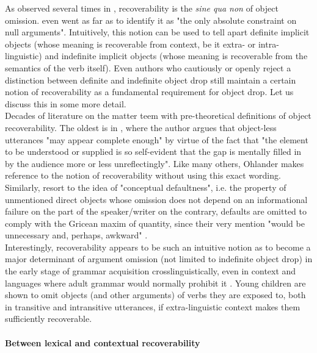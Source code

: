 As observed several times in , recoverability is the \textit{sine qua non} of object omission. \textcite{Cote1996} even went as far as to identify it as "the only absolute constraint on null arguments". Intuitively, this notion can be used to tell apart definite implicit objects (whose meaning is recoverable from context, be it extra- or intra-linguistic) and indefinite implicit objects (whose meaning is recoverable from the semantics of the verb itself). Even authors who cautiously \parencite{Resnik1993, Resnik1996, OlsenResnik1997} or openly \parencite{Glass2013, Glass2020, glass2022english} reject a distinction between definite and indefinite object drop still maintain a certain notion of recoverability as a fundamental requirement for object drop. Let us discuss this in some more detail.\\
Decades of literature on the matter teem with pre-theoretical definitions of object recoverability. The oldest is in \textcite[105]{Ohlander1943}, where the author argues that object-less utterances "may appear complete enough" by virtue of the fact that "the element to be understood or supplied is so self-evident that the gap is mentally filled in by the audience more or less unreflectingly". Like many others, Ohlander makes reference to the notion of recoverability without using this exact wording. Similarly, \textcite{HickmanEtAl2016} resort to the idea of "conceptual defaultness", i.e. the property of unmentioned direct objects whose omission does not depend on an informational failure on the part of the speaker/writer \textemdash on the contrary, defaults are omitted to comply with the Gricean maxim of quantity, since their very mention "would be unnecessary and, perhaps, awkward" \parencite[516]{HickmanEtAl2016}.\\
Interestingly, recoverability appears to be such an intuitive notion as to become a major determinant of argument omission (not limited to indefinite object drop) in the early stage of grammar acquisition crosslinguistically, even in context and languages where adult grammar would normally prohibit it \parencite{allen2000discourse, RatitamkulEtAl2004, Medina2007, sopata2016null, Rasetti2003, PerezLerouxEtAl2011, PerezLerouxEtAl2013, Perez-LerouxEtAl2018, OGradyEtAl2008, Ingham1993}. Young children are shown to omit objects (and other arguments) of verbs they are exposed to, both in transitive and intransitive utterances, if extra-linguistic context makes them sufficiently recoverable.


\paragraph{Between lexical and contextual recoverability}

